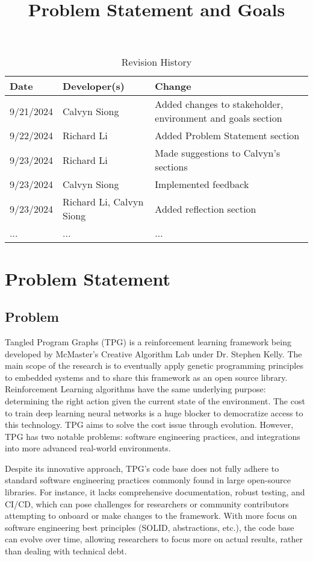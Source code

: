 \documentclass{article}
\title{Problem Statement and Goals\\\progname}
\author{\authname}
\date{}
\begin{document}
\maketitle

\begin{table}[hp]
\caption{Revision History} \label{TblRevisionHistory}
\begin{tabularx}{\textwidth}{llX}
\toprule
\textbf{Date} & \textbf{Developer(s)} & \textbf{Change}\\
\midrule
9/21/2024 & Calvyn Siong & Added changes to stakeholder, environment and goals section \\
9/22/2024 & Richard Li & Added Problem Statement section \\
9/23/2024 & Richard Li & Made suggestions to Calvyn's sections \\
9/23/2024 & Calvyn Siong & Implemented feedback \\
9/23/2024 & Richard Li, Calvyn Siong & Added reflection section \\

... & ... & ...\\
\bottomrule
\end{tabularx}
\end{table}

\section{Problem Statement}

\subsection{Problem}

Tangled Program Graphs (TPG) is a reinforcement learning framework being developed by McMaster’s Creative Algorithm Lab under Dr. Stephen Kelly. The main scope of the research is to eventually apply genetic programming principles to embedded systems and to share this framework as an open source library. Reinforcement Learning algorithms have the same underlying purpose: determining the right action given the current state of the environment. The cost to train deep learning neural networks is a huge blocker to democratize access to this technology. TPG aims to solve the cost issue through evolution. However, TPG has two notable problems: software engineering practices, and integrations into more advanced real-world environments.

Despite its innovative approach, TPG’s code base does not fully adhere to standard software engineering practices commonly found in large open-source libraries. For instance, it lacks comprehensive documentation, robust testing, and CI/CD, which can pose challenges for researchers or community contributors attempting to onboard or make changes to the framework. With more focus on software engineering best principles (SOLID, abstractions, etc.), the code base can evolve over time, allowing researchers to focus more on actual results, rather than dealing with technical debt.
\end{document}
